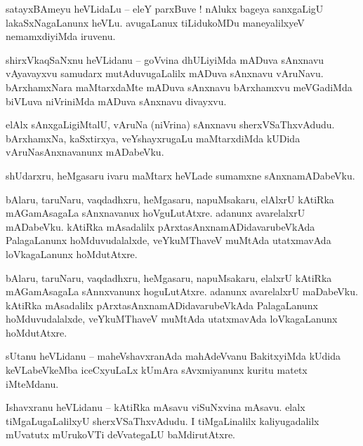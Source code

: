 \documentclass{article}
\begin{document}
\begin{mn}%
satayxBAmeyu heVLidaLu -- eleY parxBuve ! nAlukx bageya sanxgaLigU lakaSxNagaLanunx heVLu. 
avugaLanux tiLidukoMDu maneyalilxyeV nemamxdiyiMda iruvenu.
\end{mn}

\begin{mn}%
shirxVkaqSaNxnu heVLidanu -- goVvina dhULiyiMda mADuva sAnxnavu vAyavayxvu samudarx 
mutAduvugaLalilx mADuva sAnxnavu vAruNavu. bArxhamxNara maMtarxdaMte mADuva sAnxnavu bArxhamxvu 
meVGadiMda biVLuva niVriniMda mADuva sAnxnavu divayxvu.
\end{mn}

\begin{mn}%
elAlx sAnxgaLigiMtalU, vAruNa (niVrina) sAnxnavu sherxVSaThxvAdudu. bArxhamxNa, kaSxtirxya, 
veYshayxrugaLu maMtarxdiMda kUDida vAruNasAnxnavanunx mADabeVku.
\end{mn}

\begin{mn}%
shUdarxru, heMgasaru ivaru maMtarx heVLade sumamxne sAnxnamADabeVku.
\end{mn}

\begin{mn}%
bAlaru, taruNaru, vaqdadhxru, heMgasaru, napuMsakaru, elAlxrU kAtiRka mAGamAsagaLa sAnxnavanux 
hoVguLutAtxre. adanunx avarelalxrU mADabeVku. kAtiRka mAsadalilx pArxtasAnxnamADidavarubeVkAda 
PalagaLanunx hoMduvudalalxde, veYkuMThaveV muMtAda utatxmavAda loVkagaLanunx hoMdutAtxre.
\end{mn}

\begin{mn}%
bAlaru, taruNaru, vaqdadhxru, heMgasaru, napuMsakaru, elalxrU kAtiRka mAGamAsagaLa sAnnxvanunx 
hoguLutAtxre. adanunx avarelalxrU maDabeVku. kAtiRka mAsadalilx pArxtasAnxnamADidavarubeVkAda 
PalagaLanunx hoMduvudalalxde, veYkuMThaveV muMtAda utatxmavAda loVkagaLanunx hoMdutAtxre.
\end{mn}


\begin{mn}%
sUtanu heVLidanu -- maheVshavxranAda mahAdeVvanu BakitxyiMda kUdida keVLabeVkeMba iceCxyuLaLx 
kUmAra sAvxmiyanunx kuritu matetx iMteMdanu.
\end{mn}

\begin{mn}%
Ishavxranu heVLidanu -- kAtiRka mAsavu viSuNxvina mAsavu. elalx tiMgaLugaLalilxyU 
sherxVSaThxvAdudu. I tiMgaLinalilx kaliyugadalilx mUvatutx mUrukoVTi deVvategaLU baMdirutAtxre.
\end{mn}
\end{document}
